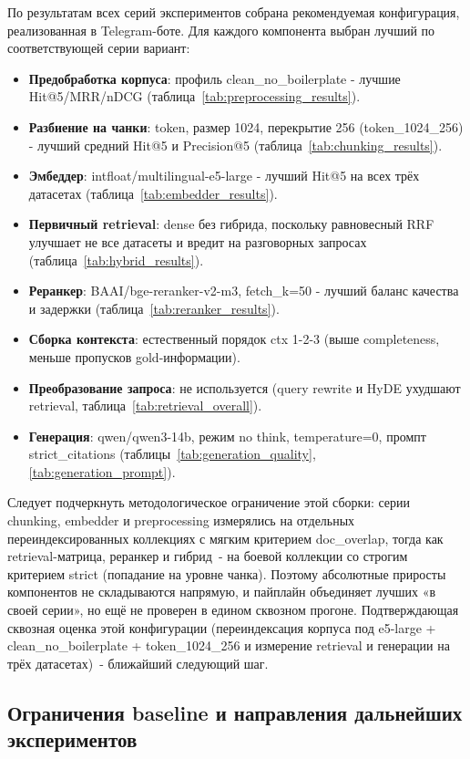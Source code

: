 \documentclass[a4paper,12pt]{article}
\begin{document}
По результатам всех серий экспериментов собрана рекомендуемая конфигурация, реализованная в Telegram-боте. Для каждого компонента выбран лучший по соответствующей серии вариант:
\begin{itemize}
  \item \textbf{Предобработка корпуса}: профиль clean\_no\_boilerplate - лучшие Hit@5/MRR/nDCG (таблица~\ref{tab:preprocessing_results}).
  \item \textbf{Разбиение на чанки}: token, размер 1024, перекрытие 256 (token\_1024\_256) - лучший средний Hit@5 и Precision@5 (таблица~\ref{tab:chunking_results}).
  \item \textbf{Эмбеддер}: intfloat/multilingual-e5-large - лучший Hit@5 на всех трёх датасетах (таблица~\ref{tab:embedder_results}).
  \item \textbf{Первичный retrieval}: dense без гибрида, поскольку равновесный RRF улучшает не все датасеты и вредит на разговорных запросах (таблица~\ref{tab:hybrid_results}).
  \item \textbf{Реранкер}: BAAI/bge-reranker-v2-m3, fetch\_k=50 - лучший баланс качества и задержки (таблица~\ref{tab:reranker_results}).
  \item \textbf{Сборка контекста}: естественный порядок ctx 1-2-3 (выше completeness, меньше пропусков gold-информации).
  \item \textbf{Преобразование запроса}: не используется (query rewrite и HyDE ухудшают retrieval, таблица~\ref{tab:retrieval_overall}).
  \item \textbf{Генерация}: qwen/qwen3-14b, режим no think, temperature=0, промпт strict\_citations (таблицы~\ref{tab:generation_quality}, \ref{tab:generation_prompt}).
\end{itemize}

Следует подчеркнуть методологическое ограничение этой сборки: серии chunking, embedder и preprocessing измерялись на отдельных переиндексированных коллекциях с мягким критерием doc\_overlap, тогда как retrieval-матрица, реранкер и гибрид~- на боевой коллекции со строгим критерием strict (попадание на уровне чанка). Поэтому абсолютные приросты компонентов не складываются напрямую, и пайплайн объединяет лучших «в своей серии», но ещё не проверен в едином сквозном прогоне. Подтверждающая сквозная оценка этой конфигурации (переиндексация корпуса под e5-large + clean\_no\_boilerplate + token\_1024\_256 и измерение retrieval и генерации на трёх датасетах)~- ближайший следующий шаг.

\subsection{Ограничения baseline и направления дальнейших экспериментов}
\end{document}
